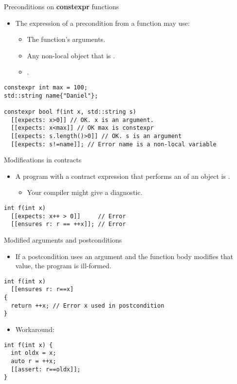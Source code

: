 \begin{frame}[t,fragile]{Preconditions on \textbf{constexpr} functions}
\begin{itemize}
  \item The expression of a precondition from a  function may use:
    \begin{itemize}
      \item The function’s arguments.
      \item Any non-local object that is .
      \item {}.
    \end{itemize}
\end{itemize}
\begin{lstlisting}
constexpr int max = 100;
std::string name{"Daniel"};

constexpr bool f(int x, std::string s)
  [[expects: x>0]] // OK. x is an argument.
  [[expects: x<max]] // OK max is constexpr
  [[expects: s.length()>0]] // OK. s is an argument
  [[expects: s!=name]]; // Error name is a non-local variable
\end{lstlisting}
\end{frame}

\begin{frame}[t,fragile]{Modifications in contracts}
\begin{itemize}
  \item A program with a contract expression that performs an
 of an object is .
    \begin{itemize}
      \item Your compiler might give a diagnostic.
    \end{itemize}
\end{itemize}

\vfill\pause
\begin{lstlisting}
int f(int x)
  [[expects: x++ > 0]]     // Error
  [[ensures r: r == ++x]]; // Error
\end{lstlisting}
\end{frame}

\begin{frame}[t,fragile]{Modified arguments and postconditions}
\begin{itemize}
  \item If a postcondition uses an argument and the function body modifies that
value, the program is ill-formed.
\end{itemize}

\vfill\pause
\begin{lstlisting}
int f(int x)
  [[ensures r: r==x]
{
  return ++x; // Error x used in postcondition
}
\end{lstlisting}
\pause
\begin{itemize}
  \item Workaround:
\end{itemize}
\begin{lstlisting}
int f(int x) {
  int oldx = x;
  auto r = ++x; 
  [[assert: r==oldx]];
}
\end{lstlisting}
\end{frame}

